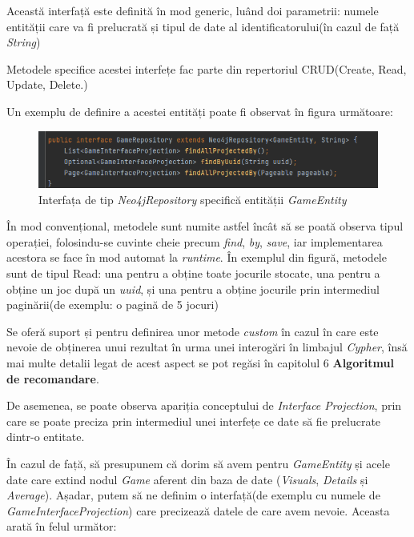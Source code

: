 \documentclass[12pt,a4paper]{report}
\begin{document}
Această interfață este definită în mod generic, luând doi parametrii: numele entității care va fi prelucrată și tipul de date al identificatorului(în cazul de față \emph{String})

Metodele specifice acestei interfețe fac parte din repertoriul CRUD(Create, Read, Update, Delete.)

Un exemplu de definire a acestei entități poate fi observat în figura următoare:

\begin{figure}[H]
\centering
\caption{}
\includegraphics[scale = 0.8]{exemplu_19_repository}
\caption*{Interfața de tip \emph{Neo4jRepository} specifică entității \emph{GameEntity}}
\end{figure}

În mod convențional, metodele sunt numite astfel încât să se poată observa tipul operației, folosindu-se cuvinte cheie precum \emph{find}, \emph{by}, \emph{save}, iar implementarea acestora se face în mod automat la \emph{runtime}. În exemplul din figură, metodele sunt de tipul Read: una pentru a obține toate jocurile stocate, una pentru a obține un joc după un \emph{uuid}, și una pentru a obține jocurile prin intermediul paginării(de exemplu: o pagină de 5 jocuri)

Se oferă suport și pentru definirea unor metode \emph{custom} în cazul în care este nevoie de obținerea unui rezultat în urma unei interogări în limbajul \emph{Cypher}, însă mai multe detalii legat de acest aspect se pot regăsi în capitolul 6 \textbf{Algoritmul de recomandare}.

De asemenea, se poate observa apariția conceptului de \emph{Interface Projection}, prin care se poate preciza prin intermediul unei interfețe ce date să fie prelucrate dintr-o entitate. 

În cazul de față, să presupunem că dorim să avem pentru \emph{GameEntity} și acele date care extind nodul \emph{Game} aferent din baza de date (\emph{Visuals}, \emph{Details} și \emph{Average}). Așadar, putem să ne definim o interfață(de exemplu cu numele de \emph{GameInterfaceProjection}) care precizează datele de care avem nevoie. Aceasta arată în felul următor:
\end{document}
